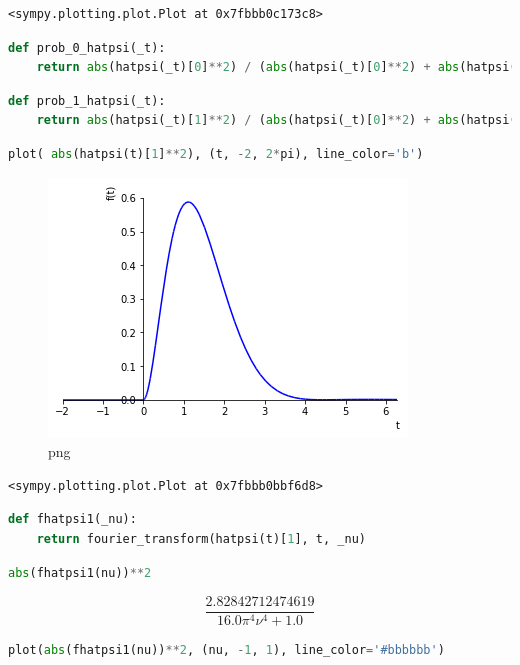 \begin{lstlisting}
<sympy.plotting.plot.Plot at 0x7fbbb0c173c8>
\end{lstlisting}

\begin{lstlisting}[language=Python]
def prob_0_hatpsi(_t):
    return abs(hatpsi(_t)[0]**2) / (abs(hatpsi(_t)[0]**2) + abs(hatpsi(_t)[1]**2))
\end{lstlisting}

\begin{lstlisting}[language=Python]
def prob_1_hatpsi(_t):
    return abs(hatpsi(_t)[1]**2) / (abs(hatpsi(_t)[0]**2) + abs(hatpsi(_t)[1]**2))
\end{lstlisting}

\begin{lstlisting}[language=Python]
plot( abs(hatpsi(t)[1]**2), (t, -2, 2*pi), line_color='b')
\end{lstlisting}

\begin{figure}
\centering
\includegraphics[width=0.66\linewidth]{output_53_0.png}
\caption[]{png}
\end{figure}

\begin{lstlisting}
<sympy.plotting.plot.Plot at 0x7fbbb0bbf6d8>
\end{lstlisting}

\begin{lstlisting}[language=Python]
def fhatpsi1(_nu):
    return fourier_transform(hatpsi(t)[1], t, _nu)
\end{lstlisting}

\begin{lstlisting}[language=Python]
abs(fhatpsi1(nu))**2
\end{lstlisting}

\[\frac{2.82842712474619}{16.0 \pi^{4} \nu^{4} + 1.0}\]

\begin{lstlisting}[language=Python]
plot(abs(fhatpsi1(nu))**2, (nu, -1, 1), line_color='#bbbbbb')
\end{lstlisting}


